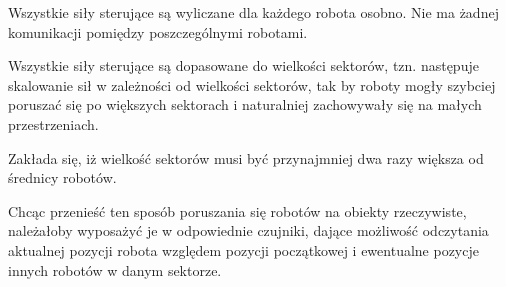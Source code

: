 	Wszystkie siły sterujące są wyliczane dla każdego robota osobno. Nie ma żadnej komunikacji pomiędzy poszczególnymi robotami.
	
	Wszystkie siły sterujące są dopasowane do wielkości sektorów, tzn. następuje skalowanie sił w zależności od wielkości sektorów, tak by roboty mogły szybciej poruszać się po większych sektorach i naturalniej zachowywały się na małych przestrzeniach.
	
	Zakłada się, iż wielkość sektorów musi być przynajmniej dwa razy większa od średnicy robotów.
	
	Chcąc przenieść ten sposób poruszania się robotów na obiekty rzeczywiste, należałoby wyposażyć je w odpowiednie czujniki, dające możliwość odczytania aktualnej pozycji robota względem pozycji początkowej i ewentualne pozycje innych robotów w danym sektorze.
	
